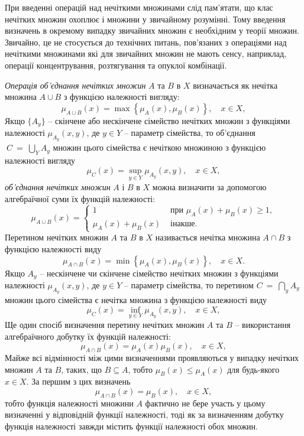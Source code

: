\documentclass[14pt, a4paper, oneside]{extarticle}
\numberwithin{equation}{section}
\begin{document}
При введенні операцій над нечіткими множинами слід пам'ятати, що клас нечітких множин охоплює і множини у звичайному розумінні. Тому введення визначень в окремому випадку звичайних множин є необхідним у теорії множин. Звичайно, це не стосується до технічних питань, пов'язаних з операціями над нечіткими множинами які для звичайних множин не мають сенсу, наприклад, операції концентрування, розтягування та опуклої комбінації.

\textit{Операція об'єднання нечітких множин} $A$ та $B$ в $X$ визначається як нечітка множина $A \cup B$ з функцією належності вигляду:
\begin{equation*}
\mu_{A \cup B}(x)=\max \left\{\mu_A(x), \mu_B(x)\right\}, \quad x \in X,
\end{equation*}
Якщо $\{A_y\}$ -- скінчене або нескінчене сімейство нечітких множин з функціями належності $\mu_{A_y}(x, y)$, де $y \in Y$ -- параметр сімейства, то об'єднання $~C~=~\bigcup_Y A_y$ множин цього сімейства є нечіткою множиною з функцією належності вигляду
\begin{equation*}
\mu_C(x)=\sup _{y \in Y} \mu_{A_y}(x, y), \quad x \in X,
\end{equation*}
\textit{об'єднання нечітких множин} $A$ і $B$ в $X$ можна визначити за допомогою алгебраїчної суми їх функцій належності:
\begin{equation*}
\mu_{A \cup B}(x)=\left\{\begin{array}{cc}
1 & \text { при } \mu_A(x)+\mu_B(x) \geq 1, \\
\mu_A(x)+\mu_B(x) & \text { інакше. }
\end{array}\right.
\end{equation*}
Перетином нечітких множин $A$ та $B$ в $X$ називається нечітка множина $A \cap B$ з функцією належності виду
\begin{equation*}
\mu_{A \cap B}(x)=\min \left\{\mu_A(x), \mu_B(x)\right\}, \quad x \in X.
\end{equation*}
Якщо ${A_y}$ -- нескінчене чи скінчене сімейство нечітких множин з функціями належності $\mu_{A_y}(x, y)$, де $y \in Y$ -- параметр сімейства, то перетином $C~=~\bigcap_{y} A_y$ множин цього сімейства є нечітка множина з функцією належності виду
\begin{equation*}
\mu_C(x)=\inf _{y \in Y} \mu_{A_y}(x, y), \quad x \in X ,
\end{equation*}
Ще один спосіб визначення перетину нечітких множин $A$ та $B$ -- використання алгебраїчного добутку їх функцій належності:
\begin{equation*}
\mu_{A \cap B}(x)=\mu_A(x) \mu_B(x), \quad x \in X,
\end{equation*}
Майже всі відмінності між цими визначеннями проявляються у випадку нечітких множин $A$ та $B$, таких, що $B \subseteq A$, тобто $\mu_B(x) \leq \mu_A(x)$ для будь-якого $x \in X$. За першим з цих визначень
\begin{equation*}
\mu_{A \cap B}(x)=\mu_B(x), \quad x \in X,
\end{equation*}
тобто функція належності множини $A$ фактично не бере участь у цьому визначенні у відповідній функції належності, тоді як за визначенням добутку функція належності завжди містить функції належності обох множин.
\end{document}
